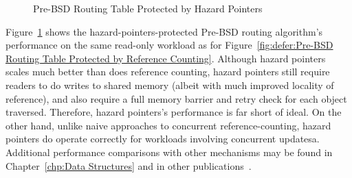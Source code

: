 \begin{figure}[tb]
\centering
{}
\caption{Pre-BSD Routing Table Protected by Hazard Pointers}
\label{fig:defer:Pre-BSD Routing Table Protected by Hazard Pointers}
\end{figure}

Figure~\ref{fig:defer:Pre-BSD Routing Table Protected by Hazard Pointers}
shows the hazard-pointers-protected Pre-BSD routing algorithm's
performance on the same read-only workload as for
Figure~\ref{fig:defer:Pre-BSD Routing Table Protected by Reference Counting}.
Although hazard pointers scales much better than does reference counting,
hazard pointers still require readers to do writes to shared
memory (albeit with much improved locality of reference),
and also require a full memory barrier and retry check for each
object traversed.
Therefore, hazard pointers's performance is far short of ideal.
On the other hand, unlike naive approaches to concurrent reference-counting,
hazard pointers do operate correctly for workloads
involving concurrent updatesa.
Additional performance comparisons with other mechanisms may be found in
Chapter~\ref{chp:Data Structures}
and in other publications~\cite{ThomasEHart2007a,McKenney:2013:SDS:2483852.2483867,MagedMichael04a}.

